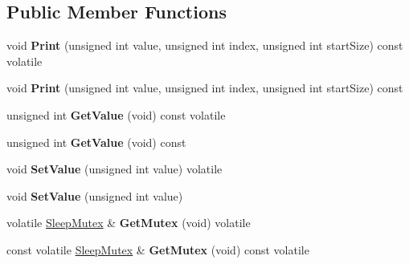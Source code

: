 \subsection*{Public Member Functions}
\begin{DoxyCompactItemize}
\item 
\hypertarget{classThing_a25ecc2b95c1e874c65862090d3994587}{}void {\bfseries Print} (unsigned int value, unsigned int index, unsigned int start\+Size) const  volatile\label{classThing_a25ecc2b95c1e874c65862090d3994587}

\item 
\hypertarget{classThing_a32a7e5ee26236a3dad00539ca5c230ae}{}void {\bfseries Print} (unsigned int value, unsigned int index, unsigned int start\+Size) const \label{classThing_a32a7e5ee26236a3dad00539ca5c230ae}

\item 
\hypertarget{classThing_aa7d807385b05b3eabdb1ee81497f6004}{}unsigned int {\bfseries Get\+Value} (void) const  volatile\label{classThing_aa7d807385b05b3eabdb1ee81497f6004}

\item 
\hypertarget{classThing_a3f1428a2a284cf59d1a5342696d4681a}{}unsigned int {\bfseries Get\+Value} (void) const \label{classThing_a3f1428a2a284cf59d1a5342696d4681a}

\item 
\hypertarget{classThing_ac48c676a776fc82f7d63eb25630dfb7c}{}void {\bfseries Set\+Value} (unsigned int value) volatile\label{classThing_ac48c676a776fc82f7d63eb25630dfb7c}

\item 
\hypertarget{classThing_ae65961f2a5ff2f9375118a06c358dc8e}{}void {\bfseries Set\+Value} (unsigned int value)\label{classThing_ae65961f2a5ff2f9375118a06c358dc8e}

\item 
\hypertarget{classThing_a9ad6a5e903219b03b5d58a57c4b52144}{}volatile \hyperlink{classLoki_1_1LevelMutex}{Sleep\+Mutex} \& {\bfseries Get\+Mutex} (void) volatile\label{classThing_a9ad6a5e903219b03b5d58a57c4b52144}

\item 
\hypertarget{classThing_afb3d58f03044c96c4f50cf9956e33e32}{}const volatile \hyperlink{classLoki_1_1LevelMutex}{Sleep\+Mutex} \& {\bfseries Get\+Mutex} (void) const  volatile\label{classThing_afb3d58f03044c96c4f50cf9956e33e32}

\end{DoxyCompactItemize}

